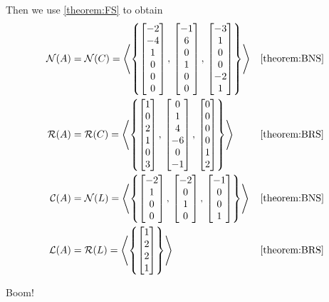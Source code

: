\documentclass{ximera}
\begin{document}
\begin{example}
  Then we use \ref{theorem:FS}  to obtain
  \begin{align*}
    \nsp{A}&=\nsp{C}=
             \spn{\set{
             \colvector{-2\\-4\\1\\0\\0\\0},\,
    \colvector{-1\\6\\0\\1\\0\\0},\,
    \colvector{-3\\1\\0\\0\\-2\\1}
    }}
           &&\ref{theorem:BNS}\\
    \rsp{A}&=\rsp{C}=
             \spn{\set{
             \colvector{1\\0\\2\\1\\0\\3 },\,
    \colvector{0\\1\\4\\-6\\0\\-1},\,
    \colvector{0\\0\\0\\0\\1\\2}
    }}
           &&\ref{theorem:BRS}\\
    \csp{A}&=\nsp{L}=
             \spn{\set{
             \colvector{-2\\1\\0\\0},\,
    \colvector{-2\\0\\1\\0},\,
    \colvector{-1\\0\\0\\1}
    }}
           &&\ref{theorem:BNS}\\
    \lns{A}&=\rsp{L}=
             \spn{\set{
             \colvector{1\\2\\2\\1}
    }}
           &&\ref{theorem:BRS}
  \end{align*}

  Boom!
\end{example}
\end{document}
